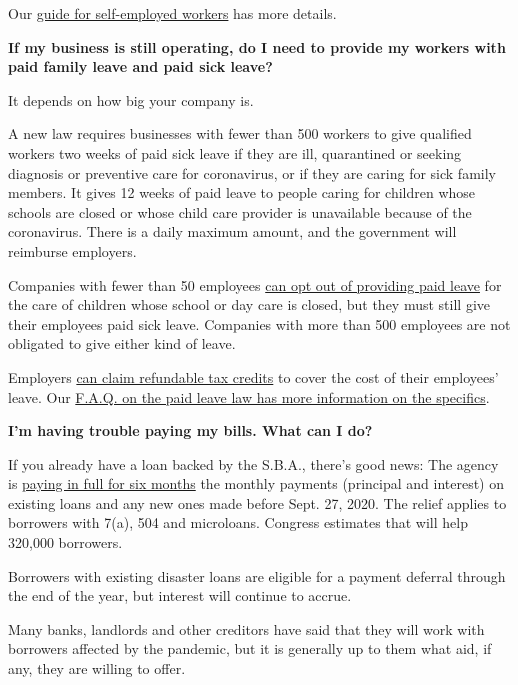 Our
\href{https://www.nytimes.com/article/self-employed-workers-unemployment-coronavirus-stimulus-package.html}{guide
for self-employed workers} has more details.

\textbf{If my business is still operating, do I need to provide my
workers with paid family leave and paid sick leave?}

It depends on how big your company is.

A new law requires businesses with fewer than 500 workers to give
qualified workers two weeks of paid sick leave if they are ill,
quarantined or seeking diagnosis or preventive care for coronavirus, or
if they are caring for sick family members. It gives 12 weeks of paid
leave to people caring for children whose schools are closed or whose
child care provider is unavailable because of the coronavirus. There is
a daily maximum amount, and the government will reimburse employers.

Companies with fewer than 50 employees
\href{https://www.nytimes.com/2020/04/02/us/politics/coronavirus-paid-leave.html}{can
opt out of providing paid leave} for the care of children whose school
or day care is closed, but they must still give their employees paid
sick leave. Companies with more than 500 employees are not obligated to
give either kind of leave.

Employers
\href{https://www.irs.gov/newsroom/covid-19-related-tax-credits-for-required-paid-leave-provided-by-small-and-midsize-businesses-faqs}{can
claim refundable tax credits} to cover the cost of their employees'
leave. Our
\href{https://www.nytimes.com/2020/03/19/upshot/coronavirus-paid-leave-guide.html}{F.A.Q.
on the paid leave law has more information on the specifics}.

\textbf{I'm having trouble paying my bills. What can I do?}

If you already have a loan backed by the S.B.A., there's good news: The
agency is
\href{https://www.sba.gov/funding-programs/loans/coronavirus-relief-options/sba-debt-relief}{paying
in full for six months} the monthly payments (principal and interest) on
existing loans and any new ones made before Sept. 27, 2020. The relief
applies to borrowers with 7(a), 504 and microloans. Congress estimates
that will help 320,000 borrowers.

Borrowers with existing disaster loans are eligible for a payment
deferral through the end of the year, but interest will continue to
accrue.

Many banks, landlords and other creditors have said that they will work
with borrowers affected by the pandemic, but it is generally up to them
what aid, if any, they are willing to offer.

